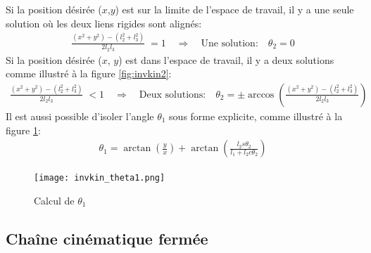 \begin{example}
Si la position désirée ($x$,$y$) est sur la limite de l'espace de travail, il y a une seule solution où les deux liens rigides sont alignés:
\begin{align}
\frac{ (x^2 + y^2) - (l_2^2 + l_3^2) }{2 l_2 l_3} \; = 1 \quad\Rightarrow\quad \text{Une solution:} \quad  \theta_2 = 0
\end{align} 
Si la position désirée ($x$, $y$) est dans l'espace de travail, il y a deux solutions comme illustré à la figure \ref{fig:invkin2}:
\begin{align}
\frac{ (x^2 + y^2) - (l_2^2 + l_3^2) }{2 l_2 l_3} \; < 1 \quad\Rightarrow\quad \text{Deux solutions:} \quad  \theta_2 = \pm \arccos \left(\frac{ (x^2 + y^2) - (l_2^2 + l_3^2) }{2 l_2 l_3}\right)
\end{align} 
Il est aussi possible d'isoler l'angle $\theta_1$ sous forme explicite, comme illustré à la figure \ref{fig:invkin_theta1}:
\begin{align}
\theta_1 = \arctan \left( \frac{y}{x} \right) + \arctan \left( \frac{l_2 s\theta_2}{l_1 + l_2 c\theta_2} \right)
\end{align} 

\begin{figure}[H]
	\centering
		\texttt{[image: invkin\_theta1.png]}
	\caption{Calcul de $\theta_1$}
	\label{fig:invkin_theta1}
\end{figure}

\end{example}


\newpage
\subsection{Chaîne cinématique fermée}

